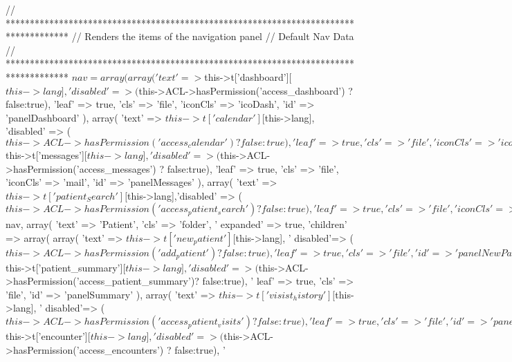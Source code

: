 \begin{DoxyCode}
                                   {
        //
       *************************************************************************************
        // Renders the items of the navigation panel
        // Default Nav Data
        //
       *************************************************************************************
        $nav = array(
            array( 'text' => $this->t['dashboard'][$this->lang],     'disabled'
      => ($this->ACL->hasPermission('access_dashboard')       ? false:true), 'leaf' =>
       true, 'cls' => 'file', 'iconCls' => 'icoDash',      'id' => 'panelDashboard' ),
            array( 'text' => $this->t['calendar'][$this->lang],      'disabled'
      => ($this->ACL->hasPermission('access_calendar')        ? false:true), 'leaf' =>
       true, 'cls' => 'file', 'iconCls' => 'icoCalendar',  'id' => 'panelCalendar' ),
            array( 'text' => $this->t['messages'][$this->lang],      'disabled'
      => ($this->ACL->hasPermission('access_messages')        ? false:true), 'leaf' =>
       true, 'cls' => 'file', 'iconCls' => 'mail',         'id' => 'panelMessages' ),
            array( 'text' => $this->t['patient_Search'][$this->lang],'disabled'
      => ($this->ACL->hasPermission('access_patient_search')  ? false:true), 'leaf' =>
       true, 'cls' => 'file', 'iconCls' => 'searchUsers',  'id' => 'panelPatientSearch
      ' ),
        );
        //
       *************************************************************************************
        // Patient Folder
        //
       *************************************************************************************
        array_push( $nav, array( 'text' => 'Patient', 'cls' => 'folder', '
      expanded' => true, 'children' =>
            array(
                array( 'text' => $this->t['new_patient'][$this->lang],      '
      disabled'=> ($this->ACL->hasPermission('add_patient')           ? false:true), '
      leaf' => true, 'cls' => 'file', 'id' => 'panelNewPatient' ),
                array( 'text' => $this->t['patient_summary'][$this->lang],  '
      disabled'=> ($this->ACL->hasPermission('access_patient_summary')? false:true), '
      leaf' => true, 'cls' => 'file', 'id' => 'panelSummary' ),
                array( 'text' => $this->t['visist_history'][$this->lang],   '
      disabled'=> ($this->ACL->hasPermission('access_patient_visits') ? false:true), '
      leaf' => true, 'cls' => 'file', 'id' => 'panelVisits' ),
                array( 'text' => $this->t['encounter'][$this->lang],        '
      disabled'=> ($this->ACL->hasPermission('access_encounters')     ? false:true), '
}
\end{DoxyCode}

